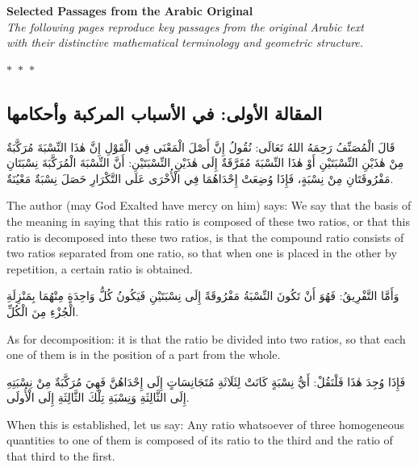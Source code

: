 \documentclass[11pt,a4paper]{article}
\theoremstyle{plain}
\theoremstyle{definition}
\theoremstyle{remark}
\newcommand{\ar}[1]{{\arabicfont\beginR #1\endR}}
\newcommand{\bilingualpair}[2]{%
  \par\noindent
  \begin{minipage}[t]{0.48\textwidth}
  #1
  \end{minipage}%
  \hfill
  \begin{minipage}[t]{0.48\textwidth}
  \vspace*{0pt}#2
  \end{minipage}\par\vspace{0.3cm}%
}
\newcommand{\ornament}{\begin{center}\textcolor{goldaccent}{$\ast$~$\ast$~$\ast$}\end{center}}
\begin{document}
\begin{center}
\textcolor{sectioncolor}{\Large\textbf{Selected Passages from the Arabic Original}}\\[0.3cm]
\textcolor{notecolor}{\textit{The following pages reproduce key passages from the original Arabic text}}\\
\textcolor{notecolor}{\textit{with their distinctive mathematical terminology and geometric structure.}}
\end{center}

\ornament

\subsection*{\ar{المقالة الأولى: في الأسباب المركبة وأحكامها}}

\bilingualpair{\ar{قَالَ الْمُصَنِّفُ رَحِمَهُ اللهُ تَعَالَى: نُقُولُ إِنَّ أَصْلَ الْمَعْنَى فِي الْقَوْلِ إِنَّ هٰذَا النِّسْبَةَ مُرَكَّبَةٌ مِنْ هٰذَيْنِ النِّسْبَتَيْنِ أَوْ هٰذَا النِّسْبَةَ مُفَرَّقَةٌ إِلَى هٰذَيْنِ النِّسْبَتَيْنِ: أَنَّ النِّسْبَةَ الْمُرَكَّبَةَ نِسْبَتَانِ مَفْرُوقَتَانِ مِنْ نِسْبَةٍ، فَإِذَا وُضِعَتْ إِحْدَاهُمَا فِي الْأُخْرَى عَلَى التَّكْرَارِ حَصَلَ نِسْبَةٌ مَعْيُنَةٌ.}}{The author (may God Exalted have mercy on him) says: We say that the basis of the meaning in saying that this ratio is composed of these two ratios, or that this ratio is decomposed into these two ratios, is that the compound ratio consists of two ratios separated from one ratio, so that when one is placed in the other by repetition, a certain ratio is obtained.}

\vspace{0.3cm}

\bilingualpair{\ar{وَأَمَّا التَّفْرِيقُ: فَهُوَ أَنْ تَكُونَ النِّسْبَةُ مَفْرُوقَةً إِلَى نِسْبَتَيْنِ فَيَكُونُ كُلُّ وَاحِدَةٍ مِنْهُمَا بِمَنْزِلَةِ الْجُزْءِ مِنَ الْكُلِّ.}}{As for decomposition: it is that the ratio be divided into two ratios, so that each one of them is in the position of a part from the whole.}

\vspace{0.3cm}

\bilingualpair{\ar{فَإِذَا وُجِدَ هٰذَا فَلْنَقُلْ: أَيُّ نِسْبَةٍ كَانَتْ لِثَلَاثَةِ مُتَجَانِسَاتٍ إِلَى إِحْدَاهُنَّ فَهِيَ مُرَكَّبَةٌ مِنْ نِسْبَتِهِ إِلَى الثَّالِثَةِ وَنِسْبَةِ تِلْكَ الثَّالِثَةِ إِلَى الْأُولَى.}}{When this is established, let us say: Any ratio whatsoever of three homogeneous quantities to one of them is composed of its ratio to the third and the ratio of that third to the first.}
\end{document}
